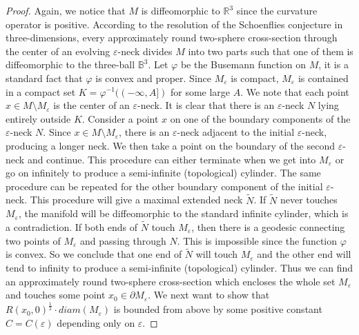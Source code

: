 \begin{proof}
Again, we notice that $M$ is diffeomorphic to $\mathbb{R}^3$ since
the curvature operator is positive. According to the resolution of
the Schoenflies conjecture in three-dimensions, every
approximately round two-sphere cross-section through the center of
an evolving $\varepsilon$-neck divides $M$ into two parts such
that one of them is diffeomorphic to the three-ball
$\mathbb{B}^3$. Let $\varphi$ be the Busemann function on $M$, it
is a standard fact that $\varphi$ is convex and proper. Since
$M_{\varepsilon}$ is compact, $M_\varepsilon$ is contained in a
compact set $K=\varphi^{-1}((-\infty,A])$ for some large $A$. We
note that each point $x\in M\setminus M_\varepsilon$ is the center
of an $\varepsilon$-neck. It is clear that there is an
$\varepsilon$-neck $N$ lying entirely outside $K$.  Consider a
point $x$ on one of the boundary components of the
$\varepsilon$-neck $N$. Since $x \in M\setminus M_{\varepsilon}$,
there is an $\varepsilon$-neck adjacent to the initial
$\varepsilon$-neck, producing a longer neck. We then take a point
on the boundary of the second $\varepsilon$-neck and continue.
This procedure can either terminate when we get into
$M_{\varepsilon}$ or go on infinitely to produce a semi-infinite
(topological) cylinder. The same procedure can be repeated for the
other boundary component of the initial $\varepsilon$-neck. This
procedure will give a maximal extended neck $\tilde{N}$. If
$\tilde{N}$ never touches $M_\varepsilon$, the manifold will be
diffeomorphic to the standard infinite cylinder, which is a
contradiction. If both ends of $\tilde{N}$ touch $M_\varepsilon$,
then there is a geodesic connecting two points of
$M_{\varepsilon}$ and passing through $N$. This is impossible
since the function $\varphi$ is convex. So we conclude that one
end of $\tilde{N}$ will touch $M_\varepsilon$ and the other end
will tend to infinity to produce a semi-infinite (topological)
cylinder. Thus we can find an approximately round two-sphere
cross-section which encloses the whole set $M_{\varepsilon}$ and
touches some point $x_{0}\in
\partial M_{\varepsilon}$. We next want to show that
$R(x_0,0)^{\frac{1}{2}}\cdot diam(M_{\varepsilon})$ is bounded
from above by some positive constant $C=C(\varepsilon)$ depending
only on $\varepsilon$.


\end{proof}
